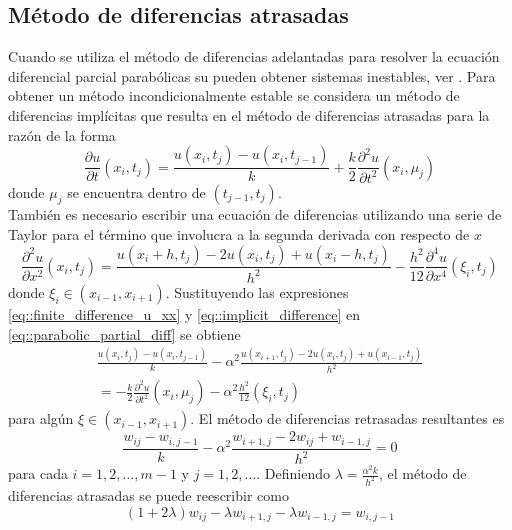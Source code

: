 \documentclass[a4paper]{article}
\begin{document}
\subsection{Método de diferencias atrasadas}
Cuando se utiliza el método de diferencias adelantadas para resolver la ecuación diferencial parcial parabólicas su pueden obtener sistemas inestables, ver \cite{Burden}. Para obtener un método incondicionalmente estable se considera un método de diferencias implícitas que resulta en el método de diferencias atrasadas para la razón de la forma
\begin{equation}\label{eq::implicit_difference}
\frac{\partial u}{\partial t}(x_i,t_j)=\frac{u(x_i,t_j)-u(x_i,t_{j-1})}{k}+\frac{k}{2}\frac{\partial ^2 u}{\partial t^2}(x_i,\mu_j)
\end{equation}
donde $\mu_j$ se encuentra dentro de $(t_{j-1},t_j)$.\\
También es necesario escribir una ecuación de diferencias utilizando una serie de Taylor para el término que involucra a la segunda derivada con respecto de $x$
\begin{equation}\label{eq::finite_difference_u_xx}
\frac{\partial^2 u}{\partial x^2}(x_i,t_j)=\frac{u(x_i+h,t_j)-2u(x_i,t_j)+u(x_i-h,t_j)}{h^2}-\frac{h^2}{12}\frac{\partial^4 u}{\partial x^4}(\xi_i,t_j)
\end{equation}
donde $\xi_i\in (x_{i-1},x_{i+1})$.
Sustituyendo las expresiones \ref{eq::finite_difference_u_xx} y \ref{eq::implicit_difference} en \ref{eq::parabolic_partial_diff} se obtiene 
\begin{equation}
\begin{aligned}
\frac{u(x_i,t_j)-u(x_i,t_{j-1})}{k}-\alpha^2 \frac{u(x_{i+1},t_{j})-2u(x_{i},t_{j})+u(x_{i-1},t_{j})}{h^2}\\
=-\frac{k}{2}\frac{\partial^2 u}{\partial t^2}(x_i,\mu_j)-\alpha^2\frac{h^2}{12}(\xi_i,t_j)
\end{aligned}
\end{equation}
para algún $\xi \in (x_{i-1},x_{i+1})$. El método de diferencias retrasadas resultantes es 
\begin{equation}\label{eq::backward_difference_method}
\frac{w_{ij}-w_{i,j-1}}{k}-\alpha^2\frac{w_{i+1,j}-2w_{ij}+w_{i-1,j}}{h^2}=0
\end{equation}
para cada $i=1,2,\hdots,m-1$ y $j=1,2,\hdots$. Definiendo $\lambda=\frac{\alpha^2 k}{h^2}$, el método de diferencias atrasadas se puede reescribir como
\begin{equation}\label{eq::backward_difference_method_lambda}
(1+2\lambda)w_{ij}-\lambda w_{i+1,j}-\lambda w_{i-1,j}=w_{i,j-1}
\end{equation}
\end{document}
